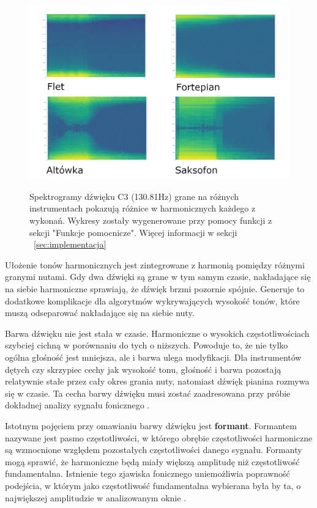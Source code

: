 \documentclass[12pt,a4paper,twoside]{mwart}
\begin{document}
\begin{figure}[t]
  \begin{center}
  \includegraphics[scale=1.35]{images/spectogram_instruments.png}\\
  \caption{Spektrogramy dźwięku C3 (130.81Hz) grane na różnych instrumentach pokazują różnice w harmonicznych każdego z wykonań. Wykresy zostały wygenerowane przy pomocy funkcji z sekcji "Funkcje pomocnicze". Więcej informacji w sekcji ~\ref{sec:implementacja}}
  \label{fig:spektrogram}
  \end{center}
\end{figure}

Ułożenie tonów harmonicznych jest zintegrowane z harmonią pomiędzy różnymi granymi nutami. Gdy dwa dźwięki są grane w tym samym czasie, nakładające się na siebie harmoniczne sprawiają, że dźwięk brzmi pozornie spójnie. Generuje to dodatkowe komplikacje dla algorytmów wykrywających wysokość tonów, które muszą odseparować nakładające się na siebie nuty.

Barwa dźwięku nie jest stała w czasie. Harmoniczne o wysokich częstotliwościach szybciej cichną w porównaniu do tych o niższych. Powoduje to, że nie tylko ogólna głośność jest mniejsza, ale i barwa ulega modyfikacji. Dla instrumentów dętych czy skrzypiec cechy jak wysokość tonu, głośność i barwa pozostają relatywnie stałe przez cały okres grania nuty, natomiast dźwięk pianina rozmywa się w czasie. Ta cecha barwy dźwięku musi zostać zaadresowana przy próbie dokładnej analizy sygnału fonicznego \cite[64-65]{Homerecording:DlaKazdego} \cite{MultipleFundamentalFrequencyEstimation}.

Istotnym pojęciem przy omawianiu barwy dźwięku jest \textbf{formant}. Formantem nazywane jest pasmo częstotliwości, w którego obrębie częstotliwości harmoniczne są wzmocnione względem pozostałych częstotliwości danego sygnału. Formanty mogą sprawić, że harmoniczne będą miały większą amplitudę niż częstotliwość fundamentalna. Istnienie tego zjawiska fonicznego uniemożliwia poprawność podejścia, w którym jako częstotliwość fundamentalna wybierana była by ta, o największej amplitudzie w analizowanym oknie \cite[62-63]{BarwaDzwieku:Formant}.
\end{document}
